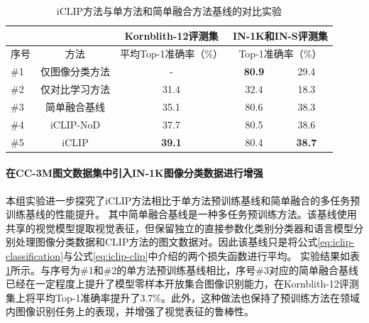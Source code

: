 \begin{table}
  \centering
\caption{iCLIP方法与单方法和简单融合方法基线的对比实验}
  \begin{tabular}{lcccc}
    \toprule
    \multicolumn{1}{c}{} &
    \multicolumn{1}{c}{} & 
    \multicolumn{1}{c}{Kornblith-12评测集}
    & \multicolumn{2}{c}{IN-1K和IN-S评测集} \\
    \midrule
    序号 & 方法 & 平均Top-1准确率（\%） & \multicolumn{2}{c}{Top-1准确率（\%）} \\
    \midrule
    \#1 & 仅图像分类方法 & - & \textbf{80.9} & 29.4 \\
    \#2 & 仅对比学习方法 & 31.4 & 32.4 & 18.3  \\
    \#3 & 简单融合基线 & 35.1 & 80.6 & 38.3 \\
    \#4 & iCLIP-NoD & 37.7 & 80.5 & 38.6 \\
    \#5 & iCLIP & \textbf{39.1} & 80.4 & \textbf{38.7} \\
    \bottomrule
  \end{tabular}
  \label{tab:iclip-ablate_cc}
\end{table}

\paragraph{在CC-3M图文数据集中引入IN-1K图像分类数据进行增强} 本组实验进一步探究了iCLIP方法相比于单方法预训练基线和简单融合的多任务预训练基线的性能提升。
其中简单融合基线是一种多任务预训练方法。该基线使用共享的视觉模型提取视觉表征，但保留独立的直接参数化类别分类器和语言模型分别处理图像分类数据和CLIP方法的图文数据对。因此该基线只是将公式\eqref{eq:iclip-classification}与公式\eqref{eq:iclip-clip}中介绍的两个损失函数进行平均。
实验结果如表\ref{tab:iclip-ablate_cc}所示。与序号为\#1和\#2的单方法预训练基线相比，序号\#3对应的简单融合基线已经在一定程度上提升了模型零样本开放集合图像识别能力，在Kornblith-12评测集上将平均Top-1准确率提升了3.7\%。此外，这种做法也保持了预训练方法在领域内图像识别任务上的表现，并增强了视觉表征的鲁棒性。

